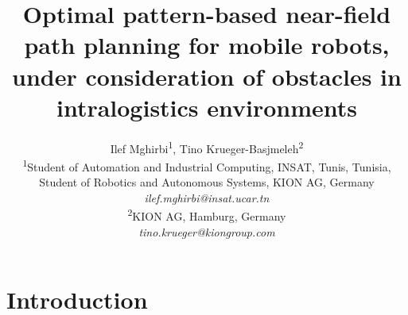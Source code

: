 \documentclass{amam}                %
\title{Optimal pattern-based near-field path planning for mobile robots, under consideration of obstacles in intralogistics environments}
\author{Ilef Mghirbi\textsuperscript{1}, Tino Krueger-Basjmeleh\textsuperscript{2}\\
\textsuperscript{1}Student of Automation and Industrial Computing, INSAT, Tunis, Tunisia, \\Student of Robotics and Autonomous Systems, KION AG, Germany\\
  {\it ilef.mghirbi@insat.ucar.tn} \\
\textsuperscript{2}KION AG, Hamburg, Germany\\
  {\it tino.krueger@kiongroup.com} \\
}
\begin{document}
\maketitle


\section{Introduction}
\end{document}

